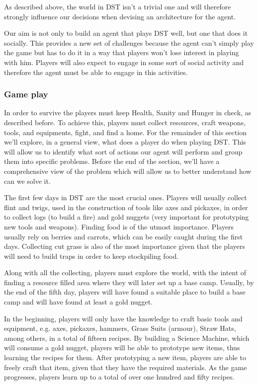 As described above, the world in \ac{DST} isn't a trivial one and will therefore strongly influence our decisions when devising an architecture for the agent.

Our aim is not only to build an agent that plays \ac{DST} well, but one that does it socially.
This provides a new set of challenges because the agent can't simply play the game but has to do it in a way that players won't lose interest in playing with him.
Players will also expect to engage in some sort of social activity and therefore the agent must be able to engage in this activities.

\subsubsection{Game play}
In order to survive the players must keep Health, Sanity and Hunger in check, as described before.
To achieve this, players must collect resources, craft weapons, tools, and equipments, fight, and find a home.
For the remainder of this section we'll explore, in a general view, what does a player do when playing \ac{DST}.
This will allow us to identify what sort of actions our agent will perform and group them into specific problems.
Before the end of the section, we'll have a comprehensive view of the problem which will allow us to better understand how can we solve it.

The first few days in \ac{DST} are the most crucial ones.
Players will usually collect flint and twigs, used in the construction of tools like axes and pickaxes, in order to collect logs (to build a fire) and gold nuggets (very important for prototyping new tools and weapons).
Finding food is of the utmost importance. 
Players usually rely on berries and carrots, which can be easily caught during the first days.
Collecting cut grass is also of the most importance given that the players will need to build traps in order to keep stockpiling food.

Along with all the collecting, players must explore the world, with the intent of finding a resource filled area where they will later set up a base camp.
Usually, by the end of the fifth day, players will have found a suitable place to build a base camp and will have found at least a gold nugget.

In the beginning, players will only have the knowledge to craft basic tools and equipment, e.g. axes, pickaxes, hammers, Grass Suits (armour), Straw Hats, among others, in a total of fifteen recipes.
By building a Science Machine, which will consume a gold nugget, players will be able to prototype new items, thus learning the recipes for them.
After prototyping a new item, players are able to freely craft that item, given that they have the required materials.
As the game progresses, players learn up to a total of over one hundred and fifty recipes.

